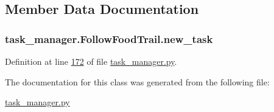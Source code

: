 \subsection{Member Data Documentation}
\hypertarget{classtask__manager_1_1FollowFoodTrail_aefc8c49492622a4e4fa61279fd52ed12}{
\subsubsection[{new\+\_\+task}]{\setlength{\rightskip}{0pt plus 5cm}task\+\_\+manager.\+Follow\+Food\+Trail.\+new\+\_\+task}}\label{classtask__manager_1_1FollowFoodTrail_aefc8c49492622a4e4fa61279fd52ed12}


Definition at line \hyperlink{task__manager_8py_source_l00172}{172} of file \hyperlink{task__manager_8py_source}{task\+\_\+manager.\+py}.



The documentation for this class was generated from the following file\+:\begin{DoxyCompactItemize}
\item 
\hyperlink{task__manager_8py}{task\+\_\+manager.\+py}\end{DoxyCompactItemize}
